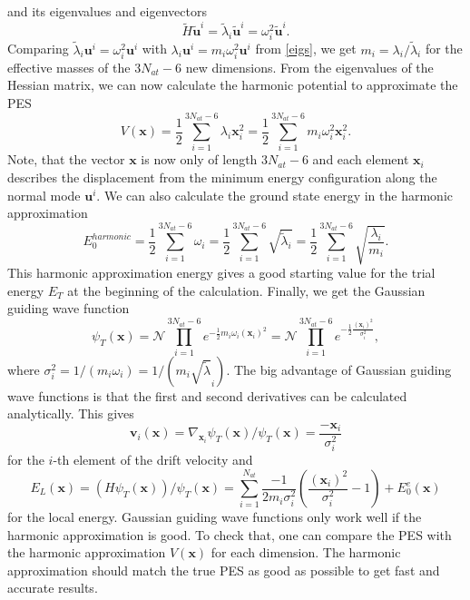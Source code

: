 \documentclass [12pt]{report}
\begin{document}
and its eigenvalues and eigenvectors
\begin{equation}
\tilde{H} \bm{\tilde{u}}^i = \tilde{\lambda}_i \bm{\tilde{u}}^i = \omega_i^2 \bm{\tilde{u}}^i.
\end{equation}
Comparing $\tilde{\lambda}_i \bm{u}^i = \omega_i^2 \bm{u}^i$ with $\lambda_i \bm{u}^i = m_i \omega_i^2 \bm{u}^i$ from \eqref{eigs}, we get $m_i = \lambda_i / \tilde{\lambda}_i$ for the effective masses of the $3 N_{at} - 6$ new dimensions.
From the eigenvalues of the Hessian matrix, we can now calculate the harmonic potential to approximate the PES
\begin{equation}
V(\bm{x}) = \frac{1}{2} \sum_{i=1}^{3N_{at}-6} \lambda_i \bm{x}_i^2 = \frac{1}{2} \sum_{i=1}^{3N_{at}-6} m_i \omega_i^2 \bm{x}_i^2.
\end{equation}
Note, that the vector $\bm{x}$ is now only of length $3 N_{at} - 6$ and  each element $\bm{x}_i$ describes the displacement from the minimum energy configuration along the normal mode $\bm{u}^i$.
We can also calculate the ground state energy in the harmonic approximation
\begin{equation}
E_0^{harmonic} = \frac{1}{2} \sum_{i=1}^{3N_{at}-6} \omega_i = \frac{1}{2}\sum_{i=1}^{3N_{at}-6}  \sqrt{\tilde{\lambda}_i} = \frac{1}{2} \sum_{i=1}^{3N_{at}-6}  \sqrt{\frac{\lambda_i}{m_i}}.
\end{equation}
This harmonic approximation energy gives a good starting value for the trial energy $E_T$ at the beginning of the calculation. Finally, we get the Gaussian guiding wave function
\begin{equation}
\psi_T(\bm{x}) = \mathcal{N} \prod_{i=1}^{3N_{at}-6}  e^{-\frac{1}{2} m_i \omega_i (\bm{x}_i)^2} = \mathcal{N} \prod_{i=1}^{3N_{at}-6} e^{-\frac{1}{2} \frac{(\bm{x}_i)^2}{\sigma_i^2}},
\end{equation}
where $\sigma_i^2 = 1/(m_i \omega_i) = 1/(m_i\sqrt{\tilde{\lambda}}_i)$. The big advantage of Gaussian guiding wave functions is that the first and second derivatives can be calculated analytically. This gives
\begin{equation}
\bm{v}_i(\bm{x}) = \nabla_{\bm{x}_i} \psi_T(\bm{x})/ \psi_T(\bm{x}) = \frac{-\bm{x}_i}{\sigma_i^2}
\end{equation}
for the $i$-th element of the drift velocity and 
\begin{equation}\label{el}
E_L(\bm{x}) = (H\psi_T(\bm{x}))/\psi_T(\bm{x}) = \sum_{i=1}^{N_{at}} \frac{-1}{2m_i \sigma^2_i} \left( \frac{(\bm{x}_i)^2}{\sigma^2_i} - 1 \right) + E_0^e(\bm{x})
\end{equation}
for the local energy.
Gaussian guiding wave functions only work well if the harmonic approximation is good. To check that, one can compare the PES with the harmonic approximation $V(\bm{x})$ for each dimension. The harmonic approximation should match the true PES as good as possible to get fast and accurate results.
\end{document}

